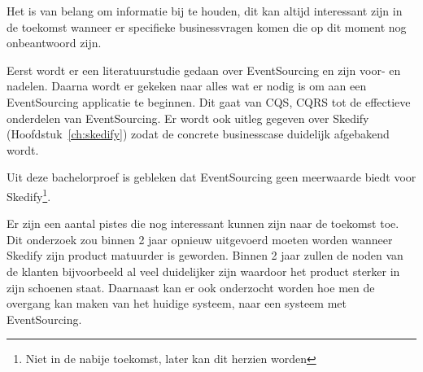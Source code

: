 Het is van belang om informatie bij te houden, dit kan altijd interessant zijn in de toekomst wanneer er specifieke businessvragen komen die op dit moment nog onbeantwoord zijn.

Eerst wordt er een literatuurstudie gedaan over EventSourcing en zijn voor- en nadelen.
Daarna wordt er gekeken naar alles wat er nodig is om aan een EventSourcing applicatie te beginnen. Dit gaat van \gls{CQS}, \gls{CQRS} tot de effectieve onderdelen van EventSourcing. Er wordt ook uitleg gegeven over Skedify (Hoofdstuk~\ref{ch:skedify}) zodat de concrete businesscase duidelijk afgebakend wordt.

Uit deze bachelorproef is gebleken dat EventSourcing geen meerwaarde biedt voor Skedify\footnote{Niet in de nabije toekomst, later kan dit herzien worden}.

Er zijn een aantal pistes die nog interessant kunnen zijn naar de toekomst toe. Dit onderzoek zou binnen 2 jaar opnieuw uitgevoerd moeten worden wanneer Skedify zijn product matuurder is geworden. Binnen 2 jaar zullen de noden van de klanten bijvoorbeeld al veel duidelijker zijn waardoor het product sterker in zijn schoenen staat. Daarnaast kan er ook onderzocht worden hoe men de overgang kan maken van het huidige systeem, naar een systeem met EventSourcing.